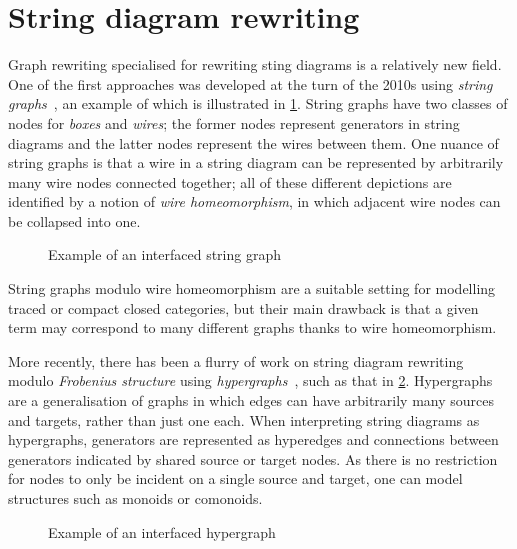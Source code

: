 \section{String diagram rewriting}

Graph rewriting specialised for rewriting sting diagrams is a
relatively new field.
One of the first approaches was developed at the turn of the 2010s using
\emph{string graphs}~\cite{%
    dixon2010open,dixon2013opengraphs,kissinger2012pictures%
}, an example of which is illustrated in \cref{fig:string-graph}.
String graphs have two classes of nodes for \emph{boxes} and \emph{wires}; the
former nodes represent generators in string diagrams and the latter nodes
represent the wires between them.
One nuance of string graphs is that a wire in a string diagram can be
represented by arbitrarily many wire nodes connected together; all of these
different depictions are identified by a notion of \emph{wire homeomorphism}, in
which adjacent wire nodes can be collapsed into one.

\begin{figure}
    \centering
    \caption{Example of an interfaced string graph}
    \label{fig:string-graph}
\end{figure}

String graphs modulo wire homeomorphism are a suitable setting for modelling
traced or compact closed categories, but their main drawback is that a given
term may correspond to many different graphs thanks to wire homeomorphism.

More recently, there has been a flurry of work on string
diagram rewriting modulo \emph{Frobenius structure} using
\emph{hypergraphs}~\cite{%
    bonchi2016rewriting,zanasi2017rewriting,bonchi2017confluence,%
    bonchi2018rewriting,bonchi2022string,bonchi2022stringa,bonchi2022stringb%
}, such as that in \cref{fig:hypergraph-intro}.
Hypergraphs are a generalisation of graphs in which edges can have arbitrarily
many sources and targets, rather than just one each.
When interpreting string diagrams as hypergraphs, generators are represented as
hyperedges and connections between generators indicated by shared source or
target nodes.
As there is no restriction for nodes to only be incident on a single source and
target, one can model structures such as monoids or comonoids.

\begin{figure}
    \centering
    \caption{Example of an interfaced hypergraph}
    \label{fig:hypergraph-intro}
\end{figure}

